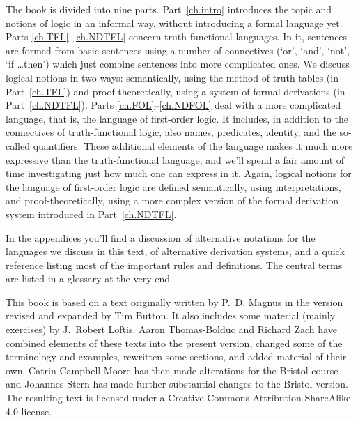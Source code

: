 The book is divided into nine parts. Part~\ref{ch.intro} introduces the topic and notions of logic in an informal way, without introducing a formal language yet.  Parts \ref{ch.TFL}--\ref{ch.NDTFL} concern truth-functional languages. In it, sentences are formed from basic sentences using a number of connectives (`or', `and', `not', `if \dots then') which just combine sentences into more complicated ones.  We discuss logical notions in two ways: semantically, using the method of truth tables (in Part~\ref{ch.TFL}) and proof-theoretically, using a system of formal derivations (in Part~\ref{ch.NDTFL}).  Parts \ref{ch.FOL}--\ref{ch.NDFOL} deal with a more complicated language, that is, the language of first-order logic. It includes, in addition to the connectives of truth-functional logic, also names, predicates, identity, and the so-called quantifiers. These additional elements of the language makes it much more expressive than the truth-functional language, and we'll spend a fair amount of time investigating just how much one can express in it.  Again, logical notions for the language of first-order logic are defined semantically, using interpretations, and proof-theoretically, using a more complex version of the formal derivation system introduced in Part~\ref{ch.NDTFL}.  

In the appendices you'll find a discussion of alternative notations for the languages we discuss in this text, of alternative derivation systems, and a quick reference listing most of the important rules and definitions. The central terms are listed in a glossary at the very end.

This book is based on a text originally written by P.~D. Magnus in the version revised and expanded by Tim Button. It also includes some material (mainly exercises) by J.~Robert Loftis. %
Aaron Thomas-Bolduc and Richard Zach have combined elements of these texts into the present version, changed some of the terminology and examples, rewritten some sections, and added material of their own.  Catrin Campbell-Moore has then made alterations for the Bristol course and Johannes Stern has made further substantial changes to the Bristol version. The resulting text is licensed under a Creative Commons Attribution-ShareAlike 4.0 license.